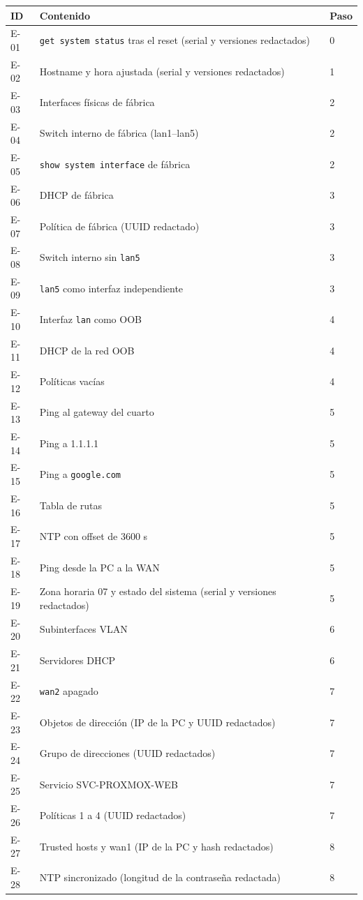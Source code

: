 \documentclass[11pt,a4paper]{article}
\begin{document}
{\footnotesize\noindent
\begin{tabularx}{\linewidth}{@{}P{1.2cm}YP{1.2cm}@{}}
\toprule
{}\textbf{ID} & \textbf{Contenido} & \textbf{Paso}\\\midrule
E-01 & \texttt{get system status} tras el reset (serial y versiones redactados) & 0 \\
E-02 & Hostname y hora ajustada (serial y versiones redactados) & 1 \\
E-03 & Interfaces físicas de fábrica & 2 \\
E-04 & Switch interno de fábrica (lan1--lan5) & 2 \\
E-05 & \texttt{show system interface} de fábrica & 2 \\
E-06 & DHCP de fábrica & 3 \\
E-07 & Política de fábrica (UUID redactado) & 3 \\
E-08 & Switch interno sin \texttt{lan5} & 3 \\
E-09 & \texttt{lan5} como interfaz independiente & 3 \\
E-10 & Interfaz \texttt{lan} como OOB & 4 \\
E-11 & DHCP de la red OOB & 4 \\
E-12 & Políticas vacías & 4 \\
E-13 & Ping al gateway del cuarto & 5 \\
E-14 & Ping a 1.1.1.1 & 5 \\
E-15 & Ping a \texttt{google.com} & 5 \\
E-16 & Tabla de rutas & 5 \\
E-17 & NTP con offset de 3600 s & 5 \\
E-18 & Ping desde la PC a la WAN & 5 \\
E-19 & Zona horaria 07 y estado del sistema (serial y versiones redactados) & 5 \\
E-20 & Subinterfaces VLAN & 6 \\
E-21 & Servidores DHCP & 6 \\
E-22 & \texttt{wan2} apagado & 7 \\
E-23 & Objetos de dirección (IP de la PC y UUID redactados) & 7 \\
E-24 & Grupo de direcciones (UUID redactados) & 7 \\
E-25 & Servicio SVC-PROXMOX-WEB & 7 \\
E-26 & Políticas 1 a 4 (UUID redactados) & 7 \\
E-27 & Trusted hosts y wan1 (IP de la PC y hash redactados) & 8 \\
E-28 & NTP sincronizado (longitud de la contraseña redactada) & 8 \\
\bottomrule
\end{tabularx}\par}
\end{document}
